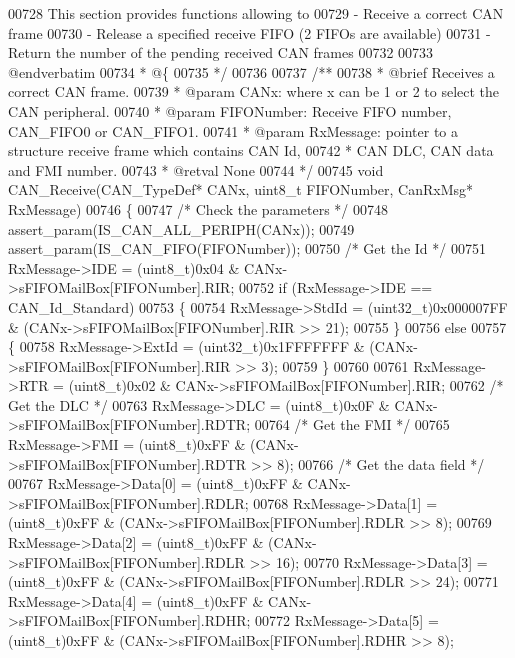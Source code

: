 \begin{DoxyCode}
00728 \textcolor{comment}{  This section provides functions allowing to }
00729 \textcolor{comment}{   -  Receive a correct CAN frame}
00730 \textcolor{comment}{   -  Release a specified receive FIFO (2 FIFOs are available)}
00731 \textcolor{comment}{   -  Return the number of the pending received CAN frames}
00732 \textcolor{comment}{   }
00733 \textcolor{comment}{@endverbatim}
00734 \textcolor{comment}{  * @\{}
00735 \textcolor{comment}{  */}
00736 
00737 \textcolor{comment}{/**}
00738 \textcolor{comment}{  * @brief  Receives a correct CAN frame.}
00739 \textcolor{comment}{  * @param  CANx: where x can be 1 or 2 to select the CAN peripheral.}
00740 \textcolor{comment}{  * @param  FIFONumber: Receive FIFO number, CAN\_FIFO0 or CAN\_FIFO1.}
00741 \textcolor{comment}{  * @param  RxMessage: pointer to a structure receive frame which contains CAN Id,}
00742 \textcolor{comment}{  *         CAN DLC, CAN data and FMI number.}
00743 \textcolor{comment}{  * @retval None}
00744 \textcolor{comment}{  */}
00745 \textcolor{keywordtype}{void} CAN_Receive(CAN\_TypeDef* CANx, uint8\_t FIFONumber, CanRxMsg* RxMessage)
00746 \{
00747   \textcolor{comment}{/* Check the parameters */}
00748   assert_param(IS\_CAN\_ALL\_PERIPH(CANx));
00749   assert_param(IS\_CAN\_FIFO(FIFONumber));
00750   \textcolor{comment}{/* Get the Id */}
00751   RxMessage->IDE = (uint8\_t)0x04 & CANx->sFIFOMailBox[FIFONumber].RIR;
00752   \textcolor{keywordflow}{if} (RxMessage->IDE == CAN_Id_Standard)
00753   \{
00754     RxMessage->StdId = (uint32\_t)0x000007FF & (CANx->sFIFOMailBox[FIFONumber].RIR >> 21);
00755   \}
00756   \textcolor{keywordflow}{else}
00757   \{
00758     RxMessage->ExtId = (uint32\_t)0x1FFFFFFF & (CANx->sFIFOMailBox[FIFONumber].RIR >> 3);
00759   \}
00760 
00761   RxMessage->RTR = (uint8\_t)0x02 & CANx->sFIFOMailBox[FIFONumber].RIR;
00762   \textcolor{comment}{/* Get the DLC */}
00763   RxMessage->DLC = (uint8\_t)0x0F & CANx->sFIFOMailBox[FIFONumber].RDTR;
00764   \textcolor{comment}{/* Get the FMI */}
00765   RxMessage->FMI = (uint8\_t)0xFF & (CANx->sFIFOMailBox[FIFONumber].RDTR >> 8);
00766   \textcolor{comment}{/* Get the data field */}
00767   RxMessage->Data[0] = (uint8\_t)0xFF & CANx->sFIFOMailBox[FIFONumber].RDLR;
00768   RxMessage->Data[1] = (uint8\_t)0xFF & (CANx->sFIFOMailBox[FIFONumber].RDLR >> 8);
00769   RxMessage->Data[2] = (uint8\_t)0xFF & (CANx->sFIFOMailBox[FIFONumber].RDLR >> 16);
00770   RxMessage->Data[3] = (uint8\_t)0xFF & (CANx->sFIFOMailBox[FIFONumber].RDLR >> 24);
00771   RxMessage->Data[4] = (uint8\_t)0xFF & CANx->sFIFOMailBox[FIFONumber].RDHR;
00772   RxMessage->Data[5] = (uint8\_t)0xFF & (CANx->sFIFOMailBox[FIFONumber].RDHR >> 8);

\end{DoxyCode}

